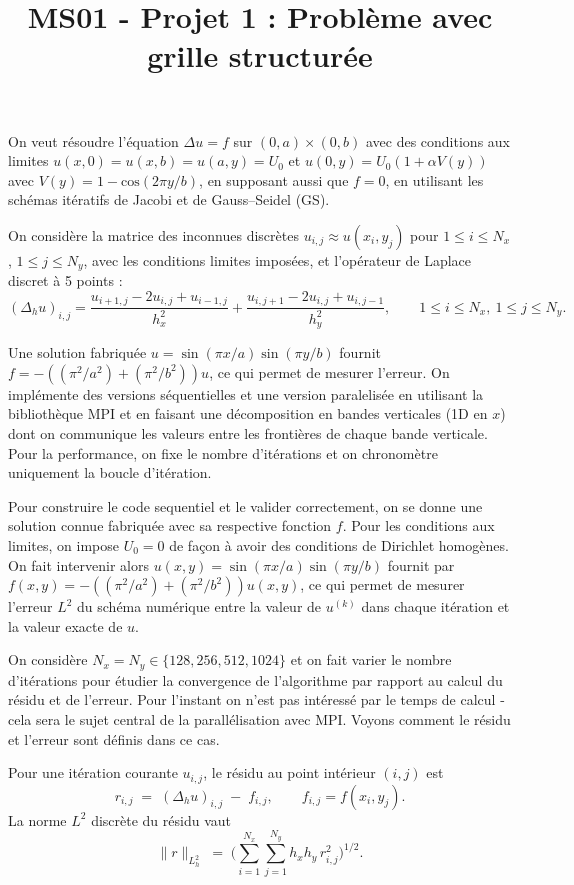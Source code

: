 \documentclass{article}
\title{MS01 - Projet 1 : Problème avec grille structurée}
\date{}
\begin{document}
\maketitle

On veut résoudre l'équation $\Delta u=f$ sur $(0,a)\times(0,b)$ avec des conditions aux limites $u(x,0) = u(x,b) = u(a,y) = U_0$ et $u(0,y) = U_0(1+ \alpha V(y))$ avec $V(y) = 1 - \mathrm{cos}(2 \pi y/b)  $, en supposant aussi que $f=0$, en utilisant les schémas itératifs de Jacobi et de Gauss--Seidel (GS). 

On considère la matrice des inconnues discrètes $u_{i,j}\approx u(x_i,y_j)$ pour $1\le i\le N_x$, $1\le j\le N_y$,
avec les conditions limites imposées, et l’opérateur de Laplace discret à 5 points :
\[
(\Delta_h u)_{i,j}
= \frac{u_{i+1,j}-2u_{i,j}+u_{i-1,j}}{h_x^2}
 + \frac{u_{i,j+1}-2u_{i,j}+u_{i,j-1}}{h_y^2},
\qquad 1\le i\le N_x,\ 1\le j\le N_y.
\]

Une solution fabriquée $u=\sin(\pi x/a)\sin(\pi y/b)$ fournit $f=-((\pi^2/a^2)+(\pi^2/b^2))u$, ce qui permet de mesurer l'erreur. On implémente des versions séquentielles et une version paralelisée en utilisant la bibliothèque MPI et en faisant une décomposition en bandes verticales (1D en $x$) dont on communique les valeurs entre les frontières de chaque bande verticale. Pour la performance, on fixe le nombre d'itérations et on chronomètre uniquement la boucle d'itération. 

Pour construire le code sequentiel et le valider correctement, on se donne une solution connue fabriquée avec sa respective fonction $f$. Pour les conditions aux limites, on impose $U_0 = 0$ de façon à avoir des conditions de Dirichlet homogènes. On fait intervenir alors $u(x,y)=\sin(\pi x/a)\sin(\pi y/b)$ fournit par $f(x,y)=-((\pi^2/a^2)+(\pi^2/b^2))u(x,y)$, ce qui permet de mesurer l'erreur $L^2$ du schéma numérique entre la valeur de $u^{(k)}$ dans chaque itération et la valeur exacte de $u$.

On considère $N_x=N_y\in\{128,256,512,1024\}$ et on fait varier le nombre d'itérations pour étudier la convergence de l'algorithme par rapport au calcul du résidu et de l'erreur. Pour l'instant on n'est pas intéressé par le temps de calcul - cela sera le sujet central de la parallélisation avec MPI. Voyons comment le résidu et l'erreur sont définis dans ce cas.

Pour une itération courante $u_{i,j}$, le résidu au point intérieur $(i,j)$ est
\[
r_{i,j} \;=\; (\Delta_h u)_{i,j}\;-\; f_{i,j},\qquad
f_{i,j}=f(x_i,y_j).
\]
La norme $L^2$ discrète du résidu vaut
\[
\|r\|_{L^2_h}
\;=\;
\Bigg( \sum_{i=1}^{N_x}\sum_{j=1}^{N_y} h_x h_y\, r_{i,j}^2 \Bigg)^{1/2}.
\]
\end{document}
